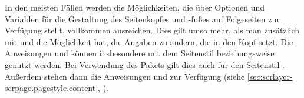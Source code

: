 \begin{Declaration}
\end{Declaration}
In den meisten Fällen werden die Möglichkeiten, die \KOMAScript{} über
Optionen und Variablen für die Gestaltung des Seitenkopfes und
-fußes auf Folgeseiten zur Verfügung stellt,
vollkommen ausreichen.  Dies gilt umso mehr, als man zusätzlich mit
 und  die Möglichkeit hat, die Angaben zu
ändern, die \KOMAScript{} in den Kopf setzt.  Die Anweisungen
 und 
können insbesondere mit dem Seitenstil
%
 beziehungsweise
 genutzt
werden. Bei Verwendung des Pakets%
\hyperref[cha:scrlayer-scrpage]{}%
gilt dies auch für den
Seitenstil %
.  Außerdem stehen dann die Anweisungen
%
 und
%
 zur Verfügung (siehe
\autoref{sec:scrlayer-scrpage.pagestyle.content},
).

